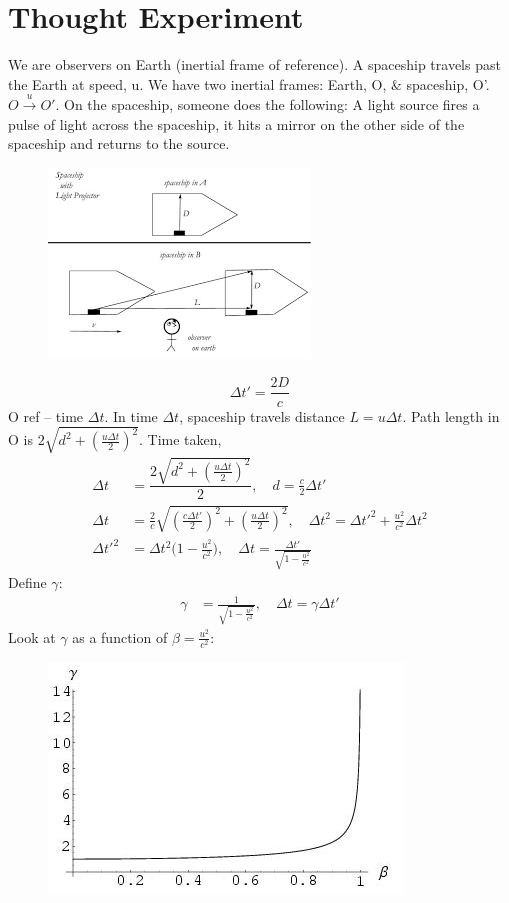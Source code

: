 \documentclass[a4paper, 11pt, normalem]{report}
\begin{document}
\section{Thought Experiment}
We are observers on Earth (inertial frame of reference).
A spaceship travels past the Earth at speed, u.
We have two inertial frames: Earth, O, \& spaceship, O'.
$O \xrightarrow{u} O'$.
On the spaceship, someone does the following:
A light source fires a pulse of light across the spaceship, it hits a mirror on the other side of the spaceship and returns to the source.
\begin{figure}[H]
    \centering
    \includegraphics{Gamma.png}
\end{figure}
\begin{equation}
    \Delta t' = \frac{2D}{c}
\end{equation}
O ref -- time $\Delta t$.
In time $\Delta t$, spaceship travels distance $L = u\Delta t$.
Path length in O is $2\sqrt{d^{2} + (\frac{u\Delta t}{2})^{2}}$.
Time taken,
\begin{align}
    \Delta t &= \dfrac{2\sqrt{d^{2} + (\frac{u\Delta t}{2})^{2}}}{2},\quad  d = \frac{c}{2}\Delta t' \\
    \Delta t &= \frac{2}{c}\sqrt{(\frac{c\Delta t'}{2})^{2} + (\frac{u\Delta t}{2})^{2}},\quad \Delta t^{2} = \Delta t'^{2} + \frac{u^{2}}{c^{2}}\Delta t^{2} \\
    \Delta t'^{2} &= \Delta t^{2}\Big(1 - \frac{u^{2}}{c^{2}}\Big),\quad \Delta t = \frac{\Delta t'}{\sqrt{1 - \tfrac{u^{2}}{c^{2}}}}
\end{align}
Define $\gamma$:
\begin{align}
    \gamma &= \frac{1}{\sqrt{1 - \tfrac{u^{2}}{c^{2}}}},\quad \Delta t = \gamma\Delta t'
\end{align}
Look at $\gamma$ as a function of $\beta = \frac{u^{2}}{c^{2}}$:
\begin{figure}[H]
    \centering
    \includegraphics{Gammafn.jpg}
\end{figure}
\end{document}
